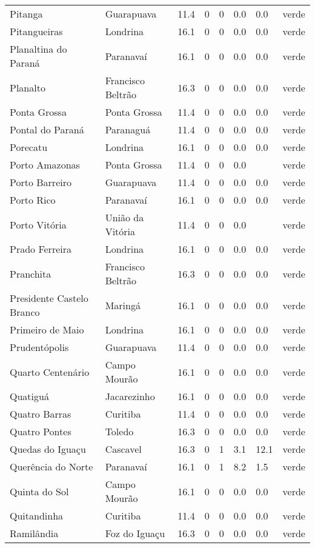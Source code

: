 \begin{longtable}{l|lllllll}
  Pitanga & Guarapuava & 11.4 & 0 & 0 & 0.0 & 0.0 & verde \\ 
  Pitangueiras & Londrina & 16.1 & 0 & 0 & 0.0 & 0.0 & verde \\ 
  Planaltina do Paraná & Paranavaí & 16.1 & 0 & 0 & 0.0 & 0.0 & verde \\ 
  Planalto & Francisco Beltrão & 16.3 & 0 & 0 & 0.0 & 0.0 & verde \\ 
  Ponta Grossa & Ponta Grossa & 11.4 & 0 & 0 & 0.0 & 0.0 & verde \\ 
  Pontal do Paraná & Paranaguá & 11.4 & 0 & 0 & 0.0 & 0.0 & verde \\ 
  Porecatu & Londrina & 16.1 & 0 & 0 & 0.0 & 0.0 & verde \\ 
  Porto Amazonas & Ponta Grossa & 11.4 & 0 & 0 & 0.0 &  & verde \\ 
  Porto Barreiro & Guarapuava & 11.4 & 0 & 0 & 0.0 & 0.0 & verde \\ 
  Porto Rico & Paranavaí & 16.1 & 0 & 0 & 0.0 & 0.0 & verde \\ 
  Porto Vitória & União da Vitória & 11.4 & 0 & 0 & 0.0 &  & verde \\ 
  Prado Ferreira & Londrina & 16.1 & 0 & 0 & 0.0 & 0.0 & verde \\ 
  Pranchita & Francisco Beltrão & 16.3 & 0 & 0 & 0.0 & 0.0 & verde \\ 
  Presidente Castelo Branco & Maringá & 16.1 & 0 & 0 & 0.0 & 0.0 & verde \\ 
  Primeiro de Maio & Londrina & 16.1 & 0 & 0 & 0.0 & 0.0 & verde \\ 
  Prudentópolis & Guarapuava & 11.4 & 0 & 0 & 0.0 & 0.0 & verde \\ 
  Quarto Centenário & Campo Mourão & 16.1 & 0 & 0 & 0.0 & 0.0 & verde \\ 
  Quatiguá & Jacarezinho & 16.1 & 0 & 0 & 0.0 & 0.0 & verde \\ 
  Quatro Barras & Curitiba & 11.4 & 0 & 0 & 0.0 & 0.0 & verde \\ 
  Quatro Pontes & Toledo & 16.3 & 0 & 0 & 0.0 & 0.0 & verde \\ 
  Quedas do Iguaçu & Cascavel & 16.3 & 0 & 1 & 3.1 & 12.1 & verde \\ 
  Querência do Norte & Paranavaí & 16.1 & 0 & 1 & 8.2 & 1.5 & verde \\ 
  Quinta do Sol & Campo Mourão & 16.1 & 0 & 0 & 0.0 & 0.0 & verde \\ 
  Quitandinha & Curitiba & 11.4 & 0 & 0 & 0.0 & 0.0 & verde \\ 
  Ramilândia & Foz do Iguaçu & 16.3 & 0 & 0 & 0.0 & 0.0 & verde \\ 

\end{longtable}
